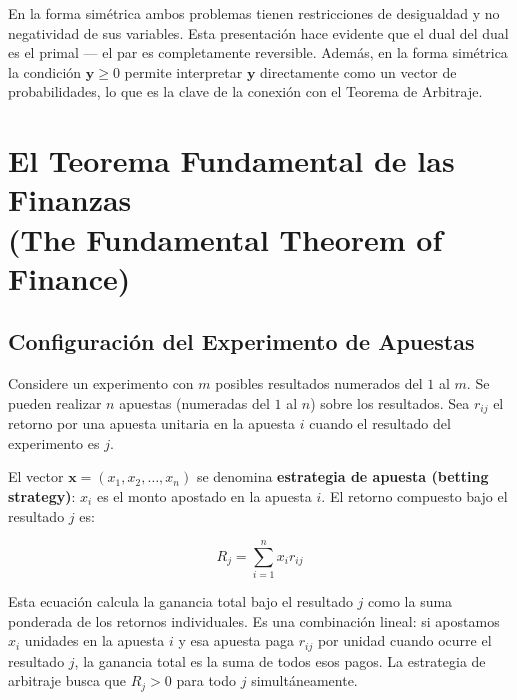 \documentclass[12pt]{article}
\begin{document}
\begin{intuicion}
En la forma sim\'etrica ambos problemas tienen restricciones de desigualdad
y no negatividad de sus variables. Esta presentaci\'on hace evidente que el
dual del dual es el primal --- el par es completamente reversible. Adem\'as,
en la forma sim\'etrica la condici\'on $\mathbf{y} \geq 0$ permite interpretar
$\mathbf{y}$ directamente como un vector de probabilidades, lo que es la clave
de la conexi\'on con el Teorema de Arbitraje.
\end{intuicion}

\section{El Teorema Fundamental de las Finanzas\\
         (The Fundamental Theorem of Finance)}

\subsection{Configuraci\'on del Experimento de Apuestas}

Considere un experimento con $m$ posibles resultados numerados del $1$ al $m$.
Se pueden realizar $n$ apuestas (numeradas del $1$ al $n$) sobre los resultados.
Sea $r_{ij}$ el retorno por una apuesta unitaria en la apuesta $i$ cuando el
resultado del experimento es $j$.

El vector $\mathbf{x} = (x_1, x_2, \ldots, x_n)$ se denomina
\textbf{estrategia de apuesta (betting strategy)}: $x_i$ es el monto apostado
en la apuesta $i$. El retorno compuesto bajo el resultado $j$ es:

\begin{equation}
  R_j = \sum_{i=1}^{n} x_i r_{ij}
\end{equation}

\begin{intuicionmat}
Esta ecuaci\'on calcula la ganancia total bajo el resultado $j$ como la
suma ponderada de los retornos individuales. Es una combinaci\'on lineal:
si apostamos $x_i$ unidades en la apuesta $i$ y esa apuesta paga $r_{ij}$
por unidad cuando ocurre el resultado $j$, la ganancia total es la suma de
todos esos pagos. La estrategia de arbitraje busca que $R_j > 0$ para
todo $j$ simult\'aneamente.
\end{intuicionmat}
\end{document}
